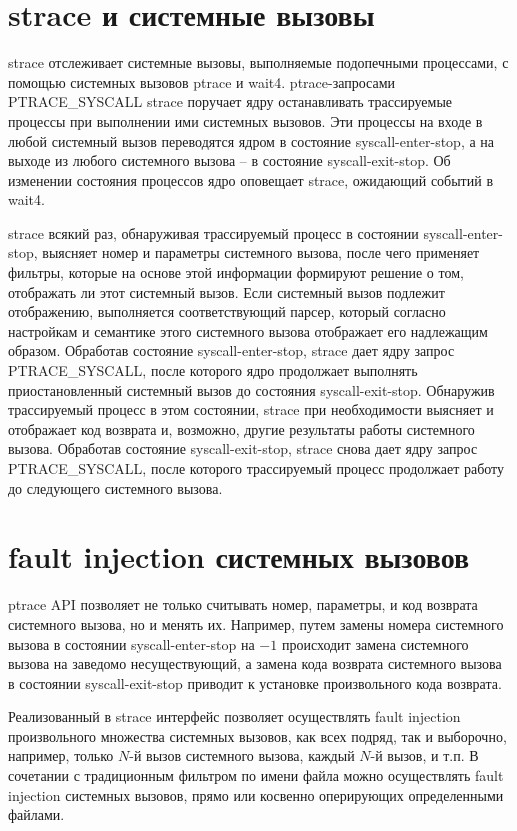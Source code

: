 \section{strace и системные вызовы}

strace отслеживает системные вызовы, выполняемые подопечными процессами,
с помощью системных вызовов ptrace и wait4.  ptrace-запросами
PTRACE\_SYSCALL strace поручает ядру останавливать трассируемые процессы
при выполнении ими системных вызовов.  Эти процессы на входе в любой
системный вызов переводятся ядром в состояние syscall-enter-stop, а на
выходе из любого системного вызова -- в состояние syscall-exit-stop.  Об
изменении состояния процессов ядро оповещает strace, ожидающий событий в
wait4.

strace всякий раз, обнаруживая трассируемый процесс в состоянии
syscall-enter-stop, выясняет номер и параметры системного вызова, после
чего применяет фильтры, которые на основе этой информации формируют
решение о том, отображать ли этот системный вызов.  Если системный вызов
подлежит отображению, выполняется соответствующий парсер, который
согласно настройкам и семантике этого системного вызова отображает его
надлежащим образом.  Обработав состояние syscall-enter-stop, strace дает
ядру запрос PTRACE\_SYSCALL, после которого ядро продолжает выполнять
приостановленный системный вызов до состояния syscall-exit-stop.
Обнаружив трассируемый процесс в этом состоянии, strace при
необходимости выясняет и отображает код возврата и, возможно, другие
результаты работы системного вызова.  Обработав состояние
syscall-exit-stop, strace снова дает ядру запрос PTRACE\_SYSCALL, после
которого трассируемый процесс продолжает работу до следующего системного
вызова.

\section{fault injection системных вызовов}

ptrace API позволяет не только считывать номер, параметры, и код
возврата системного вызова, но и менять их.  Например, путем замены
номера системного вызова в состоянии syscall-enter-stop на $-1$
происходит замена системного вызова на заведомо несуществующий, а замена
кода возврата системного вызова в состоянии syscall-exit-stop приводит к
установке произвольного кода возврата.

Реализованный в strace интерфейс позволяет осуществлять fault injection
произвольного множества системных вызовов, как всех подряд, так и
выборочно, например, только $N$-й вызов системного вызова, каждый $N$-й
вызов, и т.п.  В сочетании с традиционным фильтром по имени файла можно
осуществлять fault injection системных вызовов, прямо или косвенно
оперирующих определенными файлами.

